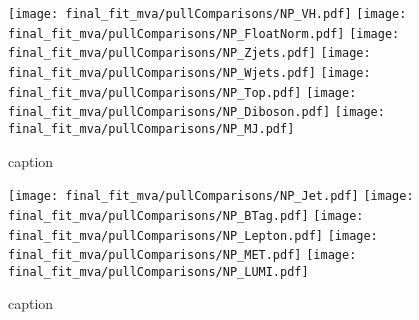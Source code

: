 %
\begin{figure}[hb]
\centering
\texttt{[image: final\_fit\_mva/pullComparisons/NP\_VH.pdf]}
\texttt{[image: final\_fit\_mva/pullComparisons/NP\_FloatNorm.pdf]}
\texttt{[image: final\_fit\_mva/pullComparisons/NP\_Zjets.pdf]}
\texttt{[image: final\_fit\_mva/pullComparisons/NP\_Wjets.pdf]}
\texttt{[image: final\_fit\_mva/pullComparisons/NP\_Top.pdf]}
\texttt{[image: final\_fit\_mva/pullComparisons/NP\_Diboson.pdf]}
\texttt{[image: final\_fit\_mva/pullComparisons/NP\_MJ.pdf]}
\caption{caption}
\label{fig:nppulls_012L_MVAVH_a} 
\end{figure}
%
\begin{figure}[hb]
\centering
\texttt{[image: final\_fit\_mva/pullComparisons/NP\_Jet.pdf]}
\texttt{[image: final\_fit\_mva/pullComparisons/NP\_BTag.pdf]}
\texttt{[image: final\_fit\_mva/pullComparisons/NP\_Lepton.pdf]}
\texttt{[image: final\_fit\_mva/pullComparisons/NP\_MET.pdf]}
\texttt{[image: final\_fit\_mva/pullComparisons/NP\_LUMI.pdf]}
\caption{caption}
\label{fig:nppulls_012L_MVAVH_b}
\end{figure}
%
